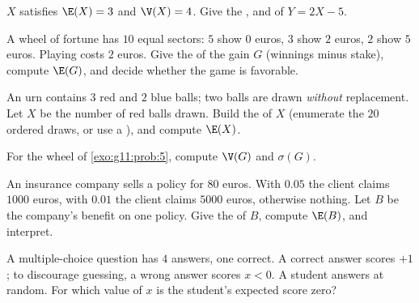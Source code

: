 \begin{exercise}[$\star$]\label{exo:g11:prob:4}
$X$ satisfies $\E(X) = 3$ and $\V(X) = 4$. Give the , 
and  of $Y = 2X - 5$.
\end{exercise}

\begin{exercise}[$\star\star$]\label{exo:g11:prob:5}
A wheel of fortune has $10$ equal sectors: $5$ show $0$ euros, $3$ show
$2$ euros, $2$ show $5$ euros. Playing costs $2$ euros. Give the
 of the gain $G$ (winnings minus stake), compute $\E(G)$, and
decide whether the game is favorable.
\end{exercise}

\begin{exercise}[$\star\star$]\label{exo:g11:prob:6}
An urn contains $3$ red and $2$ blue balls; two balls are drawn
\emph{without} replacement. Let $X$ be the number of red balls drawn.
Build the  of $X$ (enumerate the $20$ ordered draws, or use a
), and compute $\E(X)$.
\end{exercise}

\begin{exercise}[$\star\star$]\label{exo:g11:prob:7}
For the wheel of \cref{exo:g11:prob:5}, compute $\V(G)$ and $\sigma(G)$.
\end{exercise}

\begin{exercise}[$\star\star$]\label{exo:g11:prob:8}
An insurance company sells a policy for $80$ euros. With 
$0.05$ the client claims $1000$ euros, with  $0.01$ the client
claims $5000$ euros, otherwise nothing. Let $B$ be the company's benefit
on one policy. Give the  of $B$, compute $\E(B)$, and
interpret.
\end{exercise}

\begin{exercise}[$\star\star$]\label{exo:g11:prob:9}
A multiple-choice question has $4$ answers, one correct. A correct answer
scores $+1$; to discourage guessing, a wrong answer scores $x < 0$.
A student answers at random. For which value of $x$ is the student's
expected score zero?
\end{exercise}

